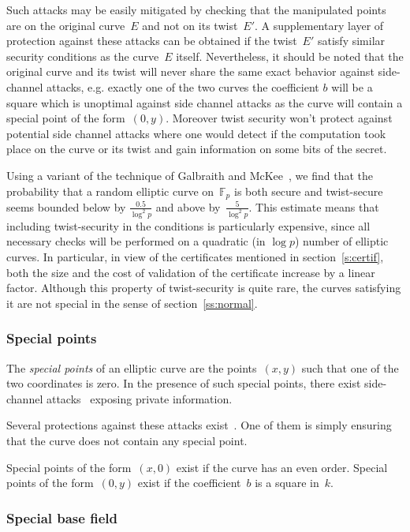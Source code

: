 \documentclass[twocolumn,letterpaper,10pt]{article}
\def\F{\mathbb{F}}
\begin{document}
Such attacks may be easily mitigated by checking
that the manipulated points are on the original curve~$E$
and not on its twist~$E'$.
A supplementary layer of protection against these attacks
can be obtained if the twist~$E'$ satisfy
similar security conditions as the curve~$E$ itself.
Nevertheless, it should be noted that the original curve and
its twist will never share the same exact behavior against
side-channel attacks, e.g. exactly one of the two curves the coefficient $b$
will be a square which is unoptimal against side channel attacks
as the curve will contain a special point of the form~$(0, y)$.
Moreover twist security won't protect against potential side channel attacks
where one would detect if the computation took place on the curve or its twist
and gain information on some bits of the secret.

Using a variant of the technique of Galbraith and McKee~\cite{lms2000gm},
we find that the probability that a random elliptic curve on~$\F_p$
is both secure and twist-secure
seems bounded below by $\frac{0.5}{\log^2 p}$
and above by~$\frac{5}{\log^2 p}$.
This estimate means that
including twist-security in the conditions is particularly expensive,
since all necessary checks will be performed on
a quadratic (in $\log p$) number of elliptic curves.
In particular, in view of
the certificates mentioned in section~\ref{s:certif},
both the size and the cost of validation of the certificate
increase by a linear factor.
Although this property of twist-security is quite rare,
the curves satisfying it are not special
in the sense of section~\ref{ss:normal}.

\subsubsection{Special points}
\label{sss:special-points}

The \emph{special points} of an elliptic curve
are the points~$(x,y)$ such that one of the two coordinates is zero.
In the presence of such special points,
there exist side-channel attacks~\cite{pkc2003goubin}
exposing private information.

Several protections against these attacks exist~\cite{ches2004mmm}.
One of them is simply ensuring that the curve does not contain
any special point.

Special points of the form~$(x, 0)$ exist if the curve has
an even order.
Special points of the form~$(0, y)$ exist if the coefficient~$b$
is a square in~$k$.

\subsubsection{Special base field}
\label{sss:special-side}
\end{document}
